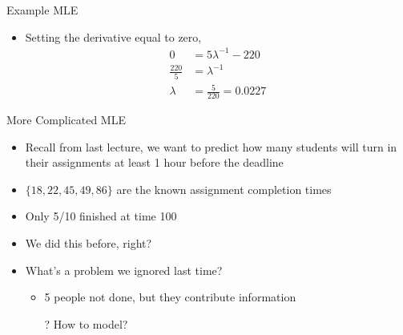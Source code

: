 \documentclass[aspectratio=169]{beamer}
\begin{document}
\begin{frame}{Example MLE}

\begin{itemize}
\item Setting the derivative equal to zero,
\begin{align}
0 &= 5 \lambda^{-1} -220   \nonumber \\
\frac{220}{5} &= \lambda^{-1} \nonumber \\
\lambda &= \frac{5}{220} = 0.0227 \nonumber 
\end{align}
\end{itemize}

\end{frame}

\begin{frame}{More Complicated MLE}

\begin{itemize}
\item Recall from last lecture, we want to predict how many students will turn in their assignments at least 1 hour before the deadline
\item $\{18, 22, 45, 49, 86\}$ are the known assignment completion times
\item Only 5/10 finished at time 100
\item We did this before, right?
\item What's a problem we ignored last time?
	\begin{itemize}
	\item 5 people not done, but they contribute information
	\item[?] How to model?
	\end{itemize}
\end{itemize}

\end{frame}
\end{document}
